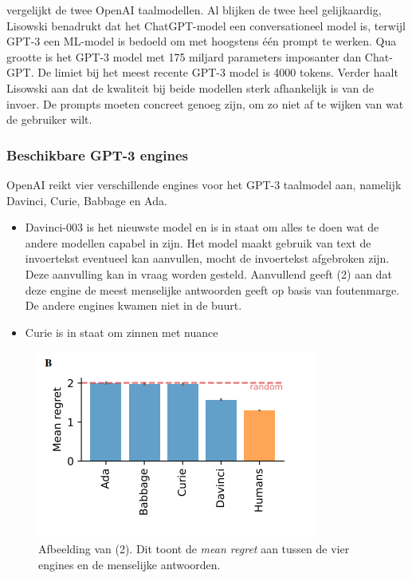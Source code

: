 
\textcite{Lisowski2023} vergelijkt de twee OpenAI taalmodellen. Al blijken de twee heel gelijkaardig, Lisowski benadrukt dat het ChatGPT-model een conversationeel model is, terwijl GPT-3 een ML-model is bedoeld om met hoogstens één prompt te werken. Qua grootte is het GPT-3 model met 175 miljard parameters imposanter dan Chat-GPT. De limiet bij het meest recente GPT-3 model is 4000 tokens. Verder haalt Lisowski aan dat de kwaliteit bij beide modellen sterk afhankelijk is van de invoer. De prompts moeten concreet genoeg zijn, om zo niet af te wijken van wat de gebruiker wilt.

\subsubsection{Beschikbare GPT-3 engines}

OpenAI reikt vier verschillende engines voor het GPT-3 taalmodel aan, namelijk Davinci, Curie, Babbage en Ada. 




\begin{itemize}
	\item Davinci-003 is het nieuwste model en is in staat om alles te doen wat de andere modellen capabel in zijn. Het model maakt gebruik van text de invoertekst eventueel kan aanvullen, mocht de invoertekst afgebroken zijn. Deze aanvulling kan in vraag worden gesteld. Aanvullend geeft (2) aan dat deze engine de meest menselijke antwoorden geeft op basis van foutenmarge. De andere engines kwamen niet in de buurt.
	\item Curie is in staat om zinnen met nuance
\end{itemize} 

\begin{figure}
	\begin{center}
		\includegraphics{img/chatgpt-engines-mean-regret.png}
		\caption{Afbeelding van (2). Dit toont de \textit{mean regret} aan tussen de vier engines en de menselijke antwoorden.}
	\end{center}
\end{figure}

